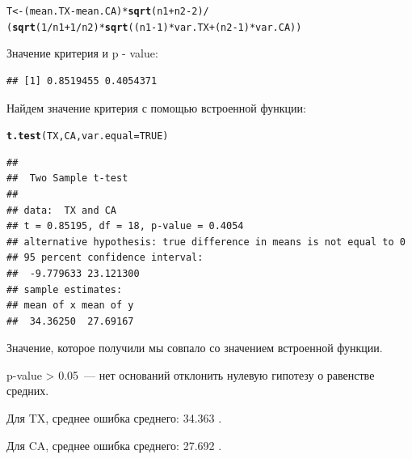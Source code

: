 \documentclass{article}\usepackage[]{graphicx}\usepackage[]{color}
\makeatletter
\newcommand{\hlnum}[1]{\textcolor[rgb]{0.686,0.059,0.569}{#1}}%
\newcommand{\hlopt}[1]{\textcolor[rgb]{0,0,0}{#1}}%
\newcommand{\hlstd}[1]{\textcolor[rgb]{0.345,0.345,0.345}{#1}}%
\newcommand{\hlkwb}[1]{\textcolor[rgb]{0.69,0.353,0.396}{#1}}%
\newcommand{\hlkwc}[1]{\textcolor[rgb]{0.333,0.667,0.333}{#1}}%
\newcommand{\hlkwd}[1]{\textcolor[rgb]{0.737,0.353,0.396}{\textbf{#1}}}%
\newenvironment{kframe}{%
 \def\at@end@of@kframe{}%
 \ifinner\ifhmode%
  \def\at@end@of@kframe{\end{minipage}}%
  \begin{minipage}{\columnwidth}%
 \fi\fi%
 \def\FrameCommand##1{\hskip\@totalleftmargin \hskip-\fboxsep
 \colorbox{shadecolor}{##1}\hskip-\fboxsep
     \hskip-\linewidth \hskip-\@totalleftmargin \hskip\columnwidth}%
 \MakeFramed {\advance\hsize-\width
   \@totalleftmargin\z@ \linewidth\hsize
   \@setminipage}}%
 {\par\unskip\endMakeFramed%
 \at@end@of@kframe}
\newenvironment{knitrout}{}{} %
\makeatother
\begin{document}
\begin{knitrout}
\color{fgcolor}\begin{kframe}
\begin{alltt}
\hlstd{T} \hlkwb{<-} \hlstd{(mean.TX} \hlopt{-} \hlstd{mean.CA)} \hlopt{*} \hlkwd{sqrt}\hlstd{(n1} \hlopt{+} \hlstd{n2} \hlopt{-} \hlnum{2}\hlstd{)} \hlopt{/}
     \hlstd{(}\hlkwd{sqrt}\hlstd{(}\hlnum{1}\hlopt{/}\hlstd{n1} \hlopt{+} \hlnum{1}\hlopt{/}\hlstd{n2)} \hlopt{*} \hlkwd{sqrt}\hlstd{((n1}\hlopt{-}\hlnum{1}\hlstd{)} \hlopt{*} \hlstd{var.TX} \hlopt{+} \hlstd{(n2} \hlopt{-} \hlnum{1}\hlstd{)} \hlopt{*} \hlstd{var.CA))}
\end{alltt}
\end{kframe}
\end{knitrout}
Значение критерия и p - value:
\begin{knitrout}
\color{fgcolor}\begin{kframe}
\begin{verbatim}
## [1] 0.8519455 0.4054371
\end{verbatim}
\end{kframe}
\end{knitrout}
Найдем значение критерия с помощью встроенной функции:
\begin{knitrout}
\color{fgcolor}\begin{kframe}
\begin{alltt}
\hlkwd{t.test}\hlstd{(TX, CA,} \hlkwc{var.equal} \hlstd{=} \hlnum{TRUE}\hlstd{)}
\end{alltt}
\begin{verbatim}
## 
## 	Two Sample t-test
## 
## data:  TX and CA
## t = 0.85195, df = 18, p-value = 0.4054
## alternative hypothesis: true difference in means is not equal to 0
## 95 percent confidence interval:
##  -9.779633 23.121300
## sample estimates:
## mean of x mean of y 
##  34.36250  27.69167
\end{verbatim}
\end{kframe}
\end{knitrout}

Значение, которое получили мы совпало со значением встроенной функции.

p-value > 0.05~--- нет оснований отклонить нулевую гипотезу о равенстве средних.

Для TX, среднее \textpm ошибка среднего: 34.363 .

Для CA, среднее \textpm ошибка среднего: 27.692 .
\end{document}
